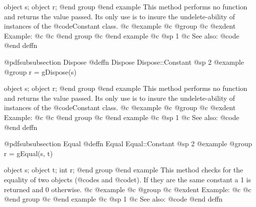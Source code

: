 object  s;
object  r;
@end group
@end example
This method performs no function and returns the value passed.  Its only
use is to insure the undelete-ability of instances of the
@code{Constant} class.
@c @example
@c @group
@c @exdent Example:
@c 
@c @end group
@c @end example
@c @sp 1
@c See also:  @code{}
@end deffn












@pdfsubsubsection {Dispose}
@deffn {Dispose} Dispose::Constant
@sp 2
@example
@group
r = gDispose(s)

object  s;
object  r;
@end group
@end example
This method performs no function and returns the value passed.  Its only
use is to insure the undelete-ability of instances of the
@code{Constant} class.
@c @example
@c @group
@c @exdent Example:
@c 
@c @end group
@c @end example
@c @sp 1
@c See also:  @code{}
@end deffn








@pdfsubsubsection {Equal}
@deffn {Equal} Equal::Constant
@sp 2
@example
@group
r = gEqual(s, t)

object  s;
object  t;
int     r;
@end group
@end example
This method checks for the equality of two objects (@code{s} and @code{t}).
If they are the same constant a 1 is returned and 0 otherwise.
@c @example
@c @group
@c @exdent Example:
@c 
@c @end group
@c @end example
@c @sp 1
@c See also:  @code{}
@end deffn



